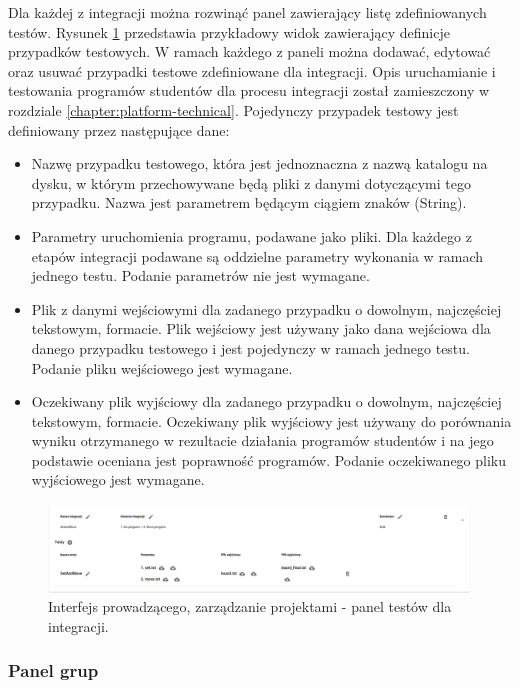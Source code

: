 Dla każdej z integracji można rozwinąć panel zawierający listę zdefiniowanych testów.
Rysunek \ref{fig:lecturer_integrations_tests} przedstawia przykładowy widok zawierający definicje przypadków testowych.
W ramach każdego z paneli można dodawać, edytować oraz usuwać przypadki testowe zdefiniowane dla integracji.
Opis uruchamianie i testowania programów studentów dla procesu integracji został zamieszczony w rozdziale \ref{chapter:platform-technical}.
Pojedynczy przypadek testowy jest definiowany przez następujące dane:
\begin {itemize}
    \item Nazwę przypadku testowego, która jest jednoznaczna z nazwą katalogu na dysku, w którym przechowywane będą pliki z danymi dotyczącymi tego przypadku.
    Nazwa jest parametrem będącym ciągiem znaków (String).
    \item Parametry uruchomienia programu, podawane jako pliki.
    Dla każdego z etapów integracji podawane są oddzielne parametry wykonania w ramach jednego testu.
    Podanie parametrów nie jest wymagane.
    \item Plik z danymi wejściowymi dla zadanego przypadku o dowolnym, najczęściej tekstowym, formacie.
    Plik wejściowy jest używany jako dana wejściowa dla danego przypadku testowego i jest pojedynczy w ramach jednego testu.
    Podanie pliku wejściowego jest wymagane.
    \item Oczekiwany plik wyjściowy dla zadanego przypadku o dowolnym, najczęściej tekstowym, formacie.
    Oczekiwany plik wyjściowy jest używany do porównania wyniku otrzymanego w rezultacie działania programów studentów i na jego podstawie oceniana jest poprawność programów.
    Podanie oczekiwanego pliku wyjściowego jest wymagane.
\end {itemize}

\begin{figure}[h]
    \centering
    \includegraphics[width = 15cm]{chapter04/lecturer_integrations_tests.png}
    \caption{Interfejs prowadzącego, zarządzanie projektami - panel testów dla integracji.}
    \label{fig:lecturer_integrations_tests}
\end{figure}

\subsubsection{Panel grup}


